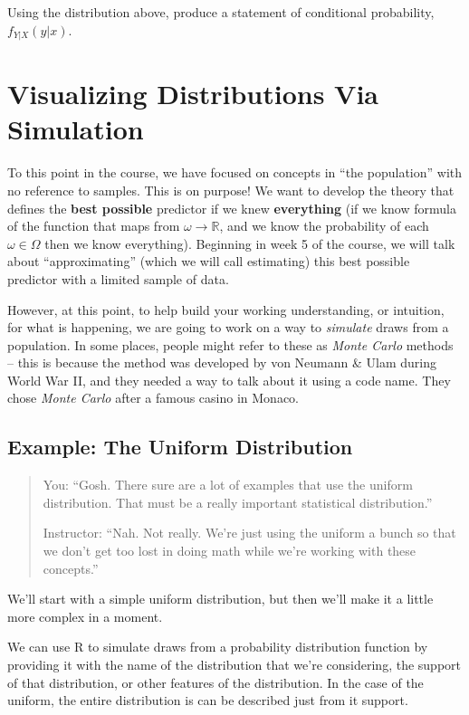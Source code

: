 \documentclass[
]{book}
\theoremstyle{definition}
\theoremstyle{definition}
\theoremstyle{definition}
\theoremstyle{definition}
\theoremstyle{remark}
\begin{document}
Using the distribution above, produce a statement of conditional probability, \(f_{Y|X}(y|x)\).

\hypertarget{visualizing-distributions-via-simulation}{%
\section{Visualizing Distributions Via Simulation}\label{visualizing-distributions-via-simulation}}

To this point in the course, we have focused on concepts in ``the population'' with no reference to samples. This is on purpose! We want to develop the theory that defines the \textbf{best possible} predictor if we knew \textbf{everything} (if we know formula of the function that maps from \(\omega \rightarrow \mathbb{R}\), and we know the probability of each \(\omega \in \Omega\) then we know everything). Beginning in week 5 of the course, we will talk about ``approximating'' (which we will call estimating) this best possible predictor with a limited sample of data.

However, at this point, to help build your working understanding, or intuition, for what is happening, we are going to work on a way to \emph{simulate} draws from a population. In some places, people might refer to these as \emph{Monte Carlo} methods -- this is because the method was developed by von Neumann \& Ulam during World War II, and they needed a way to talk about it using a code name. They chose \emph{Monte Carlo} after a famous casino in Monaco.

\hypertarget{example-the-uniform-distribution}{%
\subsection{Example: The Uniform Distribution}\label{example-the-uniform-distribution}}

\begin{quote}
You: ``Gosh. There sure are a lot of examples that use the uniform distribution. That must be a really important statistical distribution.''

Instructor: ``Nah. Not really. We're just using the uniform a bunch so that we don't get too lost in doing math while we're working with these concepts.''
\end{quote}

We'll start with a simple uniform distribution, but then we'll make it a little more complex in a moment.

We can use R to simulate draws from a probability distribution function by providing it with the name of the distribution that we're considering, the support of that distribution, or other features of the distribution. In the case of the uniform, the entire distribution is can be described just from it support.
\end{document}
